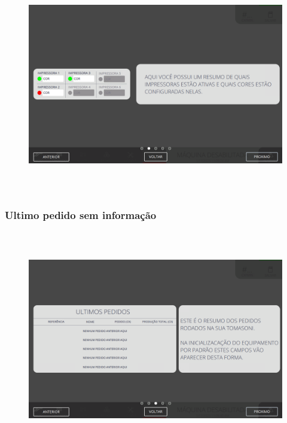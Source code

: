 \begin{figure}[h]
  \centering
  \includegraphics[width=576px,height=360px]{src/imagesFlexo/01-main/e-2.png}
\end{figure}

\vspace*{\fill}

\newpage
\thispagestyle{fancy}

\vspace*{40 pt}

\subsubsection{\small{Ultimo pedido sem informação}}\label{telaPrincialUltimoPedidoSemInformacao}

\vspace*{\fill}

\begin{figure}[h]
  \centering
  \includegraphics[width=576px,height=360px]{src/imagesFlexo/01-main/e-3.png}
\end{figure}

